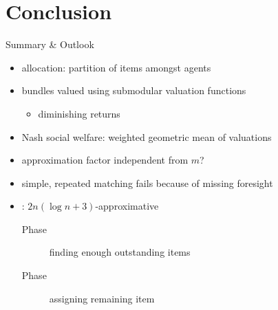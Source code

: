 \section{Conclusion}

\begin{frame}{Summary \& Outlook}
	\adjustfortopitem
	\begin{itemize}
		\item
		allocation:
		partition of items amongst agents

		\item
		bundles valued using submodular valuation functions
		\begin{itemize}
			\item
			diminishing returns
		\end{itemize}

		\item
		Nash social welfare:
		weighted geometric mean of valuations

		\item
		approximation factor independent from \(m\)?

		\item
		simple, repeated matching fails because of missing foresight

		\item
		\RepReMatch:
		\(2n (\log n + 3)\)-approximative
		\begin{description}
			\item[Phase \phasei]
			finding enough outstanding items

			\item[Phase \phaseii]
			assigning remaining item


\end{description}
\end{itemize}
\end{frame}
